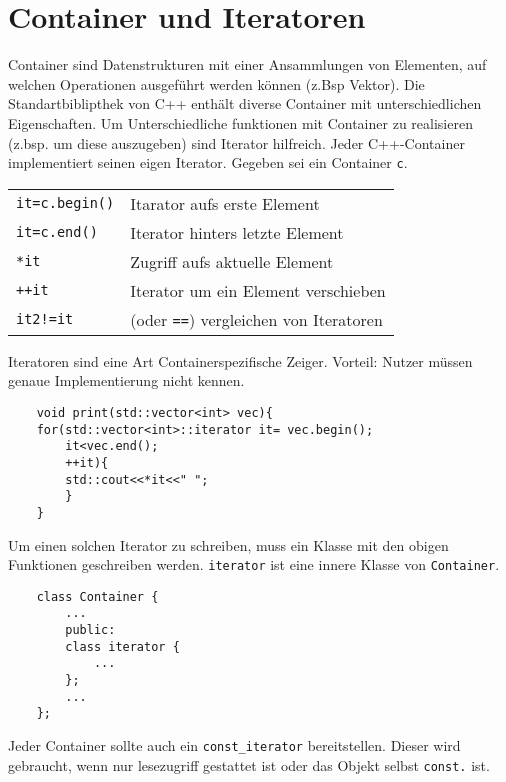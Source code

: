 \section{Container und Iteratoren}
Container sind Datenstrukturen mit einer Ansammlungen von Elementen, auf welchen Operationen ausgeführt werden können (z.Bsp Vektor).
Die Standartbiblipthek von C++ enthält diverse Container mit unterschiedlichen Eigenschaften. 
Um Unterschiedliche funktionen mit Container zu realisieren (z.bsp. um diese auszugeben) sind Iterator hilfreich. Jeder C++-Container implementiert seinen eigen Iterator. Gegeben sei ein Container \texttt{c}.
\begin{tabular}{p{}|p{}}
	\texttt{it=c.begin()} & Itarator aufs erste Element\\
	\texttt{it=c.end()} & Iterator hinters letzte Element\\
	\texttt{*it} & Zugriff aufs aktuelle Element\\
	\texttt{++it} & Iterator um ein Element verschieben\\
	\texttt{it2!=it} & (oder \texttt{==}) vergleichen von Iteratoren
\end{tabular}
Iteratoren sind eine Art Containerspezifische Zeiger. Vorteil: Nutzer müssen genaue Implementierung nicht kennen.
\begin{lstlisting}
	void print(std::vector<int> vec){
	for(std::vector<int>::iterator it= vec.begin();
		it<vec.end();
		++it){
		std::cout<<*it<<" ";
		}
	}
\end{lstlisting}
Um einen solchen Iterator zu schreiben, muss ein Klasse mit den obigen Funktionen geschreiben werden. \texttt{iterator} ist eine innere Klasse von \texttt{Container}.
\begin{lstlisting}
	class Container {
		...
		public:
		class iterator {
			...
		};
		...
	};
\end{lstlisting}
Jeder Container sollte auch ein \texttt{const\_iterator} bereitstellen. Dieser wird gebraucht, wenn nur lesezugriff gestattet ist oder das Objekt selbst \texttt{const.} ist.

